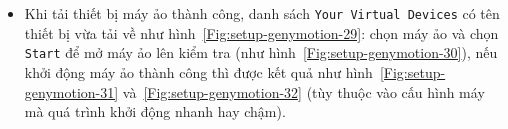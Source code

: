\documentclass[13pt,a4paper]{extreport}
\begin{document}
\begin{itemize}
\begin{itemize}
					\item Khi tải thiết bị máy ảo thành công, danh sách \verb|Your Virtual Devices| có tên thiết bị vừa tải về như hình~\ref{Fig:setup-genymotion-29}: chọn máy ảo và chọn \verb|Start| để mở máy ảo lên kiểm tra (như hình~\ref{Fig:setup-genymotion-30}), nếu khởi động máy ảo thành công thì được kết quả như hình~\ref{Fig:setup-genymotion-31} và~\ref{Fig:setup-genymotion-32} (tùy thuộc vào cấu hình máy mà quá trình khởi động nhanh hay chậm).
						\begin{figure}[!h]
							\begin{center}	
									\hspace{.5cm}
								\\

\end{center}
\end{figure}
\end{itemize}
\end{itemize}
\end{document}
